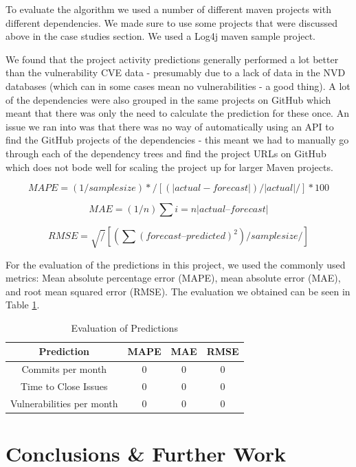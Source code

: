 \documentclass[10pt, compsoc, conference]{IEEEtran}
\begin{document}
To evaluate the algorithm we used a number of different maven projects with different dependencies. We made sure to use some projects that were discussed above in the case studies section. We used a Log4j maven sample project. 

We found that the project activity predictions generally performed a lot better than the vulnerability CVE data - presumably due to a lack of data in the NVD databases (which can in some cases mean no vulnerabilities - a good thing). A lot of the dependencies were also grouped in the same projects on GitHub which meant that there was only the need to calculate the prediction for these once. An issue we ran into was that there was no way of automatically using an API to find the GitHub projects of the dependencies - this meant we had to manually go through each of the dependency trees and find the project URLs on GitHub which does not bode well for scaling the project up for larger Maven projects. 

\[ MAPE = (1 / sample size) * /[( |actual - forecast| ) / |actual| /] * 100 \]

\[ MAE = (1/n) \sum{i=n} |actual – forecast|  \]

\[ RMSE = \sqrt/[ (\sum (forecast – predicted) ^ 2) / sample size /]  \]

For the evaluation of the predictions in this project, we used the commonly used metrics: Mean absolute percentage error (MAPE), mean absolute error (MAE), and root mean squared error (RMSE). The evaluation we obtained can be seen in Table \ref{evaluations}.

\begin{table}
 \caption{Evaluation of Predictions}
\label{evaluations}
\begin{center}
\begin{tabular}{|c|c|c|c|}
\hline
    \textbf{Prediction} & \textbf{MAPE} & \textbf{MAE} & \textbf{RMSE} \\ \hline
    Commits per month & 0 & 0 & 0 \\ \hline
    Time to Close Issues & 0 & 0 & 0  \\ \hline
    Vulnerabilities per month & 0 & 0 & 0 \\ \hline
\end{tabular}
\end{center}
\end{table}

\section{Conclusions \& Further Work}
\end{document}

